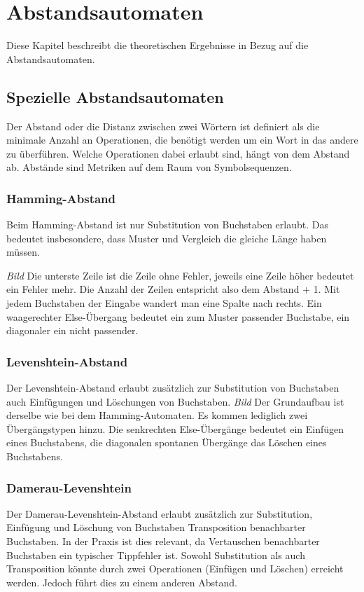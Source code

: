 \chapter{Abstandsautomaten}\label{Abstandsautomaten}
Diese Kapitel beschreibt die theoretischen Ergebnisse in Bezug auf die Abstandsautomaten.
\section{Spezielle Abstandsautomaten}
Der Abstand oder die Distanz zwischen zwei Wörtern ist definiert als die minimale Anzahl an Operationen, die benötigt werden um ein Wort in das andere zu überführen. Welche Operationen dabei erlaubt sind, hängt von dem Abstand ab. Abstände sind Metriken auf dem Raum von Symbolsequenzen.
\subsection{Hamming-Abstand}
Beim Hamming-Abstand ist nur Substitution von Buchstaben erlaubt. Das bedeutet insbesondere, dass Muster und Vergleich die gleiche Länge haben müssen.

\textit{Bild}
Die unterste Zeile ist die Zeile ohne Fehler, jeweils eine Zeile höher bedeutet ein Fehler mehr. Die Anzahl der Zeilen entspricht also dem Abstand + 1. Mit jedem Buchstaben der Eingabe wandert man eine Spalte nach rechts. Ein waagerechter Else-Übergang bedeutet ein zum Muster passender Buchstabe, ein diagonaler ein nicht passender.
\subsection{Levenshtein-Abstand}
Der Levenshtein-Abstand erlaubt zusätzlich zur Substitution von Buchstaben auch Einfügungen und Löschungen von Buchstaben.
\textit{Bild}
Der Grundaufbau ist derselbe wie bei dem Hamming-Automaten. Es kommen lediglich zwei Übergängstypen hinzu. Die senkrechten Else-Übergänge bedeutet ein Einfügen eines Buchstabens, die diagonalen spontanen Übergänge das Löschen eines Buchstabens.

\subsection{Damerau-Levenshtein}
Der Damerau-Levenshtein-Abstand erlaubt zusätzlich zur Substitution, Einfügung und Löschung von Buchstaben Transposition benachbarter Buchstaben. In der Praxis ist dies relevant, da Vertauschen benachbarter Buchstaben ein typischer Tippfehler ist. Sowohl Substitution als auch Transposition könnte durch zwei Operationen (Einfügen und Löschen) erreicht werden. Jedoch führt dies zu einem anderen Abstand.
